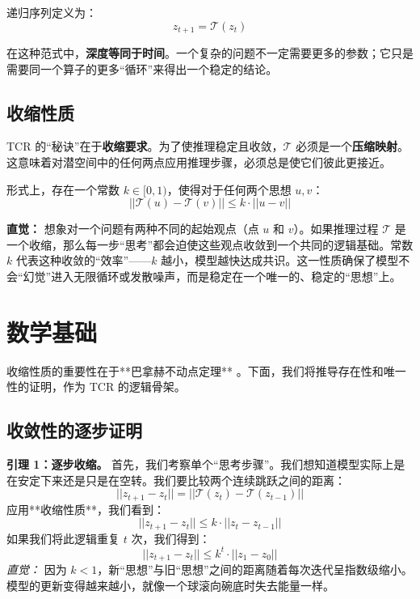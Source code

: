 \documentclass[11pt, a4paper]{article}
\begin{document}
递归序列定义为：
\begin{equation}
 z_{t+1} = \mathcal{T}(z_t) 
\end{equation}

在这种范式中，\textbf{深度等同于时间}。一个复杂的问题不一定需要更多的参数；它只是需要同一个算子的更多“循环”来得出一个稳定的结论。

\subsection{收缩性质}
TCR 的“秘诀”在于\textbf{收缩要求}。为了使推理稳定且收敛，$\mathcal{T}$ 必须是一个\textbf{压缩映射}。这意味着对潜空间中的任何两点应用推理步骤，必须总是使它们彼此更接近。

形式上，存在一个常数 $k \in [0, 1)$，使得对于任何两个思想 $u, v$：
\begin{equation}
 ||\mathcal{T}(u) - \mathcal{T}(v)|| \le k \cdot ||u - v|| 
\end{equation}

\textbf{直觉：} 想象对一个问题有两种不同的起始观点（点 $u$ 和 $v$）。如果推理过程 $\mathcal{T}$ 是一个收缩，那么每一步“思考”都会迫使这些观点收敛到一个共同的逻辑基础。常数 $k$ 代表这种收敛的“效率”——$k$ 越小，模型越快达成共识。这一性质确保了模型不会“幻觉”进入无限循环或发散噪声，而是稳定在一个唯一的、稳定的“思想”上。

\section{数学基础}

收缩性质的重要性在于**巴拿赫不动点定理** \cite{banach1922operations}。下面，我们将推导存在性和唯一性的证明，作为 TCR 的逻辑骨架。

\subsection{收敛性的逐步证明}

\textbf{引理 1：逐步收缩。}
首先，我们考察单个“思考步骤”。我们想知道模型实际上是在安定下来还是只是在空转。我们要比较两个连续跳跃之间的距离：
\begin{equation}
 ||z_{t+1} - z_t|| = ||\mathcal{T}(z_t) - \mathcal{T}(z_{t-1})|| 
\end{equation}
应用**收缩性质**，我们看到：
\begin{equation}
 ||z_{t+1} - z_t|| \le k \cdot ||z_t - z_{t-1}|| 
\end{equation}
如果我们将此逻辑重复 $t$ 次，我们得到：
\begin{equation}
 ||z_{t+1} - z_t|| \le k^t \cdot ||z_1 - z_0|| 
\end{equation}
\textit{直觉：} 因为 $k < 1$，新“思想”与旧“思想”之间的距离随着每次迭代呈指数级缩小。模型的更新变得越来越小，就像一个球滚向碗底时失去能量一样。
\end{document}
